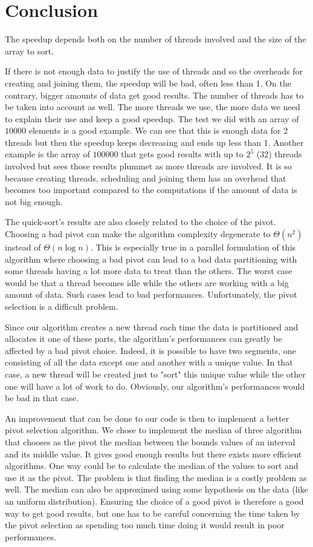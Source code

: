 \chapter{Conclusion}

The speedup depends both on the number of threads involved and the size of the array to sort. 

If there is not enough data to justify the use of threads and so the overheads for creating and joining them, the speedup will be bad, often less than 1. On the contrary, bigger amounts of data get good results. The number of threads has to be taken into account as well. The more threads we use, the more data we need to explain their use and keep a good speedup. The test we did with an array of $10000$ elements is a good example. We can see that this is enough data for 2 threads but then the speedup keeps decreasing and ends up less than 1. Another example is the array of $100000$ that gets good results with up to $2^5$ (32) threads involved but sees those results plummet as more threads are involved. It is so because creating threads, scheduling and joining them has an overhead that becomes too important compared to the computations if the amount of data is not big enough.

The quick-sort's results are also closely related to the choice of the pivot. Choosing a bad pivot can make the algorithm complexity degenerate to $\Theta(n^2)$ instead of $\Theta(n\log n)$. This is especially true in a parallel formulation of this algorithm where choosing a bad pivot can lead to a bad data partitioning with some threads having a lot more data to treat than the others. The worst case would be that a thread becomes idle while the others are working with a big amount of data. Such cases lead to bad performances. Unfortunately, the pivot selection is a difficult problem.

Since our algorithm creates a new thread each time the data is partitioned and allocates it one of these parts, the algorithm's performances can greatly be affected by a bad pivot choice. Indeed, it is possible to have two segments, one consisting of all the data except one and another with a unique value. In that case, a new thread will be created just to "sort" this unique value while the other one will have a lot of work to do. Obviously, our algorithm's performances would be bad in that case.  

An improvement that can be done to our code is then to implement a better pivot selection algorithm. We chose to implement the median of three algorithm that chooses as the pivot the median between the bounds values of an interval and its middle value. It gives good enough results but there exists more efficient algorithms. One way could be to calculate the median of the values to sort and use it as the pivot. The problem is that finding the median is a costly problem as well. The median can also be approximed using some hypothesis on the data (like an uniform distribution). Ensuring the choice of a good pivot is therefore a good way to get good results, but one has to be careful concerning the time taken by the pivot selection as spending too much time doing it would result in poor performances.


